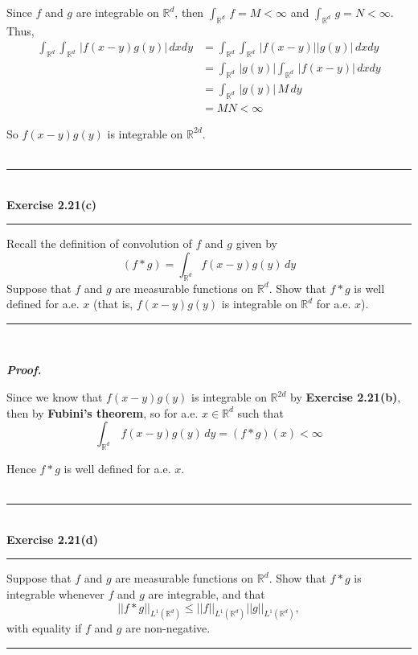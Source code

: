 \documentclass[a4paper,11pt]{article}
\begin{document}
Since $f$ and $g$ are integrable on $\mathbb{R}^d$, then $\int_{\mathbb{R}^{d}}\,f = M < \infty$ and $\int_{\mathbb{R}^{d}}\,g = N < \infty$. Thus,
	$$\begin{aligned}
	\int_{\mathbb{R}^{d}} \int_{\mathbb{R}^{d}}\,|f(x - y)g(y)|\,dxdy
	&= \int_{\mathbb{R}^{d}} \int_{\mathbb{R}^{d}}\,|f(x - y)||g(y)|\,dxdy\\
	&= \int_{\mathbb{R}^{d}}\,|g(y)|\int_{\mathbb{R}^{d}}\,|f(x - y)|\,dxdy\\
	&= \int_{\mathbb{R}^{d}}\,|g(y)|\,M\,dy\\
	&= MN < \infty
	\end{aligned}$$

So $f(x - y)g(y)$ is integrable on $\mathbb{R}^{2d}$.\\\\



\begin{flushleft}
	\rule[-0.5ex]{17cm}{2pt}\\
		\textbf{Exercise 2.21(c)}\\
	\rule[1.5ex]{17cm}{0.5pt}
		Recall the definition of convolution of $f$ and $g$ given by
			$$(f \ast g)
			= \int_{\mathbb{R}^d} f(x - y)g(y)\,dy$$
		Suppose that $f$ and $g$ are measurable functions on $\mathbb{R}^d$. Show that $f \ast g$ is well defined for a.e. $x$ (that is, $f(x - y)g(y)$ is integrable on $\mathbb{R}^d$ for a.e. $x$).
	\rule[1.0ex]{17cm}{0.5pt}\
\end{flushleft}

\textbf{\textit{Proof.}}

Since we know that $f(x - y)g(y)$ is integrable on $\mathbb{R}^{2d}$ by \textbf{Exercise 2.21(b)}, then by \textbf{Fubini's theorem}, so for a.e. $x \in \mathbb{R}^d$ such that
	$$\int_{\mathbb{R}^d}\,f(x - y)g(y)\,dy = (f \ast g)(x) < \infty$$

Hence $f \ast g$ is well defined for a.e. $x$.\\\\



\begin{flushleft}
	\rule[-0.5ex]{17cm}{2pt}\\
		\textbf{Exercise 2.21(d)}\\
	\rule[1.5ex]{17cm}{0.5pt}
		Suppose that $f$ and $g$ are measurable functions on $\mathbb{R}^d$. Show that $f \ast g$ is integrable whenever $f$ and $g$ are integrable, and that
			$$||f \ast g ||_{L^1(\mathbb{R}^d)}
			\leq ||f||_{L^1(\mathbb{R}^d)} ||g||_{L^1(\mathbb{R}^d)},$$
		with equality if $f$ and $g$ are non-negative.
	\rule[1.0ex]{17cm}{0.5pt}\
\end{flushleft}
\end{document}
